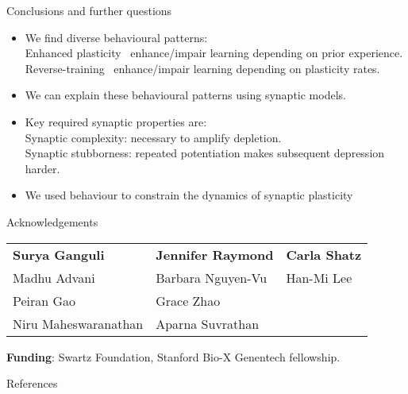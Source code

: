 \documentclass{beamer}%
\begin{document}
\begin{frame}{Conclusions and further questions}
%
 \begin{itemize}
   \item We find diverse behavioural patterns:\\

   Enhanced plasticity \lto\ enhance/impair learning depending on prior experience.\\
   Reverse-training \lto\ enhance/impair learning depending on plasticity rates.

   \item We can explain these behavioural patterns using synaptic models.

   \item Key required synaptic properties are:\\
   Synaptic complexity: necessary to amplify depletion.\\
   Synaptic stubborness: repeated potentiation makes subsequent depression harder.

   \item  We used behaviour to constrain the dynamics of synaptic plasticity
\end{itemize}
%
\end{frame}


\begin{frame}{Acknowledgements}
%
 \begin{tabular}{lll}
   \textbf{Surya Ganguli} & \textbf{Jennifer Raymond} & \textbf{Carla Shatz} \\
   Madhu Advani & Barbara Nguyen-Vu & Han-Mi Lee \\
   Peiran Gao & Grace Zhao & \\
   Niru Maheswaranathan & Aparna Suvrathan
 \end{tabular}

 \vp\textbf{Funding}: Swartz Foundation, Stanford Bio-X Genentech fellowship.
%
\end{frame}


\begin{frame}[allowframebreaks]{References}
%

 {\small
 
 
 }
%
\end{frame}


\end{document}
